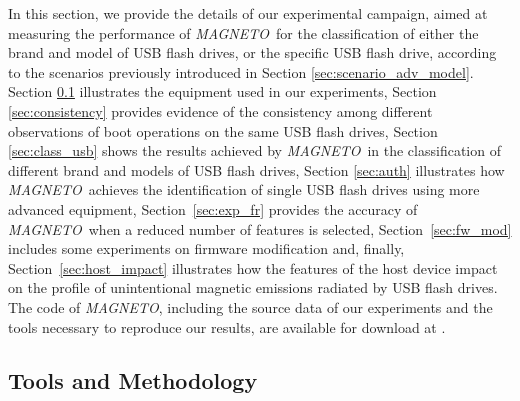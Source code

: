 \documentclass[acmsmall, authorversion]{acmart}
\newcommand{\sol}{\emph{MAGNETO}}
\begin{document}
In this section, we provide the details of our experimental campaign, aimed at measuring the performance of \sol\ for the classification of either the brand and model of USB flash drives, or the specific USB flash drive, according to the scenarios previously introduced in Section \ref{sec:scenario_adv_model}.
Section \ref{subsec:tools} illustrates the equipment used in our experiments, Section \ref{sec:consistency} provides evidence of the consistency among different observations of boot operations on the same USB flash drives, Section \ref{sec:class_usb} shows the results achieved by \sol\ in the classification of different brand and models of USB flash drives, Section \ref{sec:auth} illustrates how \sol\ achieves the identification of single USB flash drives using more advanced equipment, Section~\ref{sec:exp_fr} provides the accuracy of \sol\ when a reduced number of features is selected, Section~\ref{sec:fw_mod} includes some experiments on firmware modification and, finally, Section~\ref{sec:host_impact} illustrates how the features of the host device impact on the profile of unintentional magnetic emissions radiated by USB flash drives. \\
The code of \sol, including the source data of our experiments and the tools necessary to reproduce our results, are available for download at \cite{crilab}.

\subsection{Tools and Methodology}
\label{subsec:tools}
\end{document}
